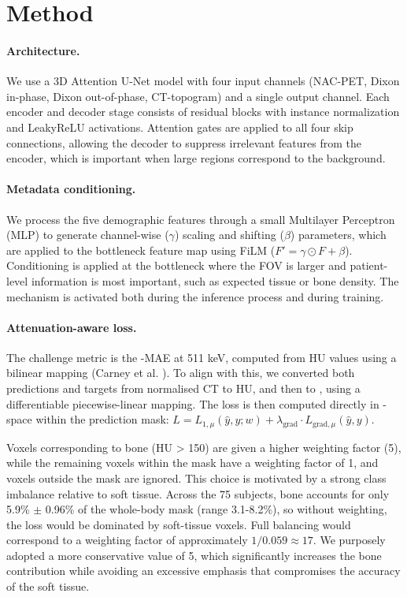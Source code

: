 \documentclass{article}
\begin{document}
\section{Method}


\paragraph{Architecture.}
We use a 3D Attention U-Net model with four input channels (NAC-PET, Dixon in-phase, Dixon out-of-phase, CT-topogram) and a single output channel. Each encoder and decoder stage consists of residual blocks with instance normalization and LeakyReLU activations.
Attention gates \cite{schlemper2019attention} are applied to all four skip connections, allowing the decoder to suppress irrelevant features from the encoder, which is important when large regions correspond to the background.

\paragraph{Metadata conditioning.}
We process the five demographic features through a small Multilayer Perceptron (MLP) to generate channel-wise ($\gamma$) scaling and shifting ($\beta$) parameters, which are applied to the bottleneck feature map using FiLM \cite{perez2018film} ($F' = \gamma \odot F + \beta$).
Conditioning is applied at the bottleneck where the FOV is larger and patient-level information is most important, such as expected tissue or bone density.
The mechanism is activated both during the inference process and during training.

\paragraph{Attenuation-aware loss.}
The challenge metric is the \textmu-MAE at 511 keV, computed from HU values using a bilinear mapping (Carney et al. \cite{carney2006method}). To align with this, we converted both predictions and targets from normalised CT to HU, and then to \textmu, using a differentiable piecewise-linear mapping. The loss is then computed directly in \textmu-space within the prediction mask:
$L = L_{1,\mu}(\hat{y}, y; w) + \lambda_{\text{grad}} \cdot L_{\text{grad},\mu}(\hat{y}, y)$.

Voxels corresponding to bone (HU > 150) are given a higher weighting factor (5), while the remaining voxels within the mask have a weighting factor of 1, and voxels outside the mask are ignored. 
This choice is motivated by a strong class imbalance relative to soft tissue.
Across the 75 subjects, bone accounts for only 5.9\% $\pm$ 0.96\% of the whole-body mask (range 3.1-8.2\%), so without weighting, the loss would be dominated by soft-tissue voxels.
Full balancing would correspond to a weighting factor of approximately ${1/}{0.059}\approx 17$. 
We purposely adopted a more conservative value of 5, which significantly increases the bone contribution while avoiding an excessive emphasis that compromises the accuracy of the soft tissue.
\end{document}
